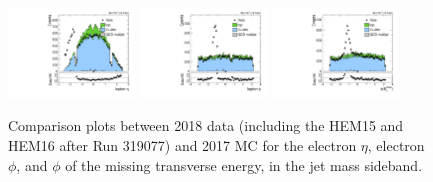 \begin{figure}[htbp]
  \centering
  \includegraphics[width=0.30\textwidth]{fig/controlPlots/SB_e_2018_lnujj_l1_l_eta.pdf}
  \includegraphics[width=0.30\textwidth]{fig/controlPlots/SB_e_2018_lnujj_l1_l_phi.pdf}
  \includegraphics[width=0.30\textwidth]{fig/controlPlots/SB_e_2018_met_phi.pdf}
  \caption{
    Comparison plots between 2018 data (including the HEM15 and HEM16 after Run 319077) and 2017 MC for the electron $\eta$, electron $\phi$, and $\phi$ of the missing transverse energy, in the jet mass sideband.
  }
  \label{fig:SB_controlPlots2018_electronexcess}
\end{figure}
